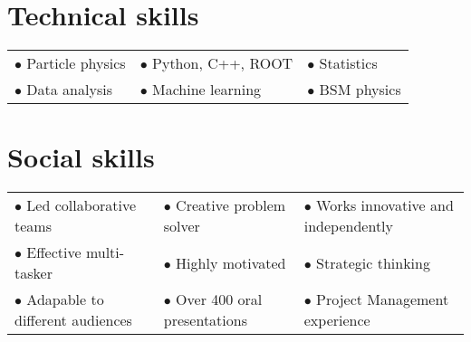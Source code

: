 \section{Technical skills}
\vspace{-1em}
\begin{tabularx}{\textwidth}{p{} p{}  p{}}
    $\bullet$ Particle physics & $\bullet$ Python, C++, ROOT & $\bullet$ Statistics \\
    $\bullet$ Data analysis & $\bullet$ Machine learning &  $\bullet$ BSM physics \\      
\end{tabularx}

\section{Social skills}
\vspace{-1em}
\begin{tabularx}{\textwidth}{p{} p{}  p{}}
    $\bullet$ Led collaborative teams & $\bullet$ Creative problem solver & $\bullet$ Works innovative  and independently\\
    $\bullet$ Effective multi-tasker & $\bullet$ Highly motivated & $\bullet$ Strategic thinking \\
    $\bullet$ Adapable to different audiences & $\bullet$ Over 400 oral presentations & $\bullet$ Project Management experience \\
 
\end{tabularx}


